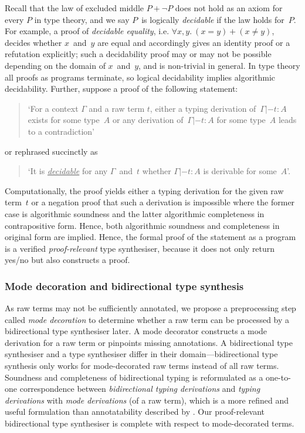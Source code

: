Recall that the law of excluded middle $P + \neg P$ does not hold as an axiom for every $P$ in type theory, and we say $P$~is logically \emph{decidable} if the law holds for~$P$.
For example, a proof of \emph{decidable equality}, i.e. $\forall x, y.~(x = y) + (x \neq y)$, decides whether $x$~and~$y$ are equal and accordingly gives an identity proof or a refutation explicitly; such a decidability proof may or may not be possible depending on the domain of $x$~and~$y$, and is non-trivial in general.
In type theory all proofs as programs terminate, so logical decidability implies algorithmic decidability.
Further, suppose a proof of the following statement:
\begin{quote}
  `For a context $\Gamma$ and a raw term $t$, either a typing derivation of\, $\Gamma |- t : A$ exists for some type~$A$ or any derivation of\, $\Gamma |- t : A$ for some type~$A$ leads to a contradiction'
\end{quote}
or rephrased succinctly as 
\begin{quote}
  `It is \underline{\emph{decidable}} for any $\Gamma$~and~$t$ whether $\Gamma |- t : A$ is derivable for some~$A$'.
\end{quote}
Computationally, the proof yields either a typing derivation for the given raw term~$t$ or a negation proof that such a derivation is impossible where the former case is algorithmic soundness and the latter algorithmic completeness in contrapositive form.
Hence, both algorithmic soundness and completeness in original form are implied.
Hence, the formal proof of the statement as a program is a verified \emph{proof-relevant} type synthesiser, because it does not only return yes/no but also constructs a proof. 

\subsubsection{Mode decoration and bidirectional type synthesis}
As raw terms may not be sufficiently annotated, we propose a preprocessing step called \emph{mode decoration} to determine whether a raw term can be processed by a bidirectional type synthesiser later.
A mode decorator constructs a mode derivation for a raw term or pinpoints missing annotations.
A bidirectional type synthesiser and a type synthesiser differ in their domain---bidirectional type synthesis only works for mode-decorated raw terms instead of all raw terms.
Soundness and completeness of bidirectional typing is reformulated as a one-to-one correspondence between \emph{bidirectional typing derivations} and \emph{typing derivations} with \emph{mode derivations} (of a raw term), which is a more refined and useful formulation than annotatability described by \citet[Section~3.2]{Dunfield2021}.
Our proof-relevant bidirectional type synthesiser is complete with respect to mode-decorated terms.

